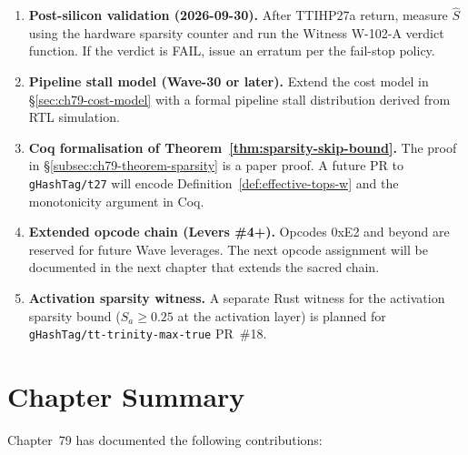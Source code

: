 \begin{enumerate}
  \item \textbf{Post-silicon validation (2026-09-30).}
        After TTIHP27a return, measure $\hat{S}$ using the hardware
        sparsity counter and run the Witness W-102-A verdict function.
        If the verdict is FAIL, issue an erratum per the fail-stop
        policy.

  \item \textbf{Pipeline stall model (Wave-30 or later).}
        Extend the cost model in §\ref{sec:ch79-cost-model} with a
        formal pipeline stall distribution derived from RTL simulation.

  \item \textbf{Coq formalisation of Theorem~\ref{thm:sparsity-skip-bound}.}
        The proof in §\ref{subsec:ch79-theorem-sparsity} is a paper proof.
        A future PR to \texttt{gHashTag/t27} will encode
        Definition~\ref{def:effective-tops-w} and the monotonicity
        argument in Coq.

  \item \textbf{Extended opcode chain (Levers \#4+).}
        Opcodes 0xE2 and beyond are reserved for future Wave leverages.
        The next opcode assignment will be documented in the next
        chapter that extends the sacred chain.

  \item \textbf{Activation sparsity witness.}
        A separate Rust witness for the activation sparsity bound
        ($S_a \geq 0.25$ at the activation layer) is planned for
        \texttt{gHashTag/tt-trinity-max-true} PR~\#18.
\end{enumerate}


\section*{Chapter Summary}
\label{sec:ch79-summary}

Chapter~79 has documented the following contributions:

